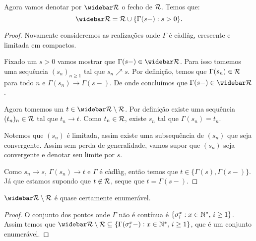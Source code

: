 \begin{proposicao}
  Agora vamos denotar por $\RRb$ o fecho de ${\mathcal{R}}$. Temos que:
  \begin{displaymath}
    \RRb = \RR \cup \{ \Gamma(s-) : s > 0 \}.
  \end{displaymath}
\end{proposicao}
\begin{proof}
  Novamente consideremos as realizações onde $\Gamma$ é càdlàg, crescente
  e limitada em compactos.

  Fixado um $s > 0$ vamos mostrar que $\Gamma(s-) \in \RRb$. Para isso
  tomemos uma sequência $(s_n)_{n \geq 1}$ tal que $s_n \nearrow s$. Por
  definição, temos que $\Gamma(s_n) \in {\mathcal{R}}$ para todo $n$ e
  $\Gamma(s_n) \to \Gamma(s-)$. De onde concluímos que $\Gamma(s-) \in
  \RRb$.

  Agora tomemos um $t \in \RRb \setminus \RR$. Por definição existe uma
  sequência $(t_n)_n \in {\mathcal{R}}$ tal que $t_n \to t$. Como $t_n \in {\mathcal{R}}$,
  existe $s_n$ tal que $\Gamma(s_n) = t_n$.

  Notemos que $(s_n)$ é limitada, assim existe uma subsequência de
  $(s_n)$ que seja convergente. Assim sem perda de generalidade, vamos
  supor que $(s_n)$ seja convergente e denotar seu limite por $s$.

  Como $s_n \to s$, $\Gamma(s_n) \to t$ e $\Gamma$ é càdlàg, então
  temos que $t \in \{ \Gamma(s), \Gamma(s-) \}$. Já que estamos
  supondo que $t \not\in {\mathcal{R}}$, seque que $t = \Gamma(s-)$.
\end{proof}

\begin{proposicao}
  $\RRb \setminus \RR$ é quase certamente enumerável.
\end{proposicao}
\begin{proof}
  O conjunto dos pontos onde $\Gamma$ não é contínua é $\{ \sigma_i^x:
  x \in {\mathbb{N^*}}, \, i \geq 1\}$. Assim temos que $\RRb \setminus \RR
  \subseteq \{ \Gamma(\sigma_i^x-): x \in \Nz, \, i \geq 1\}$, que é
  um conjunto enumerável.
\end{proof}

